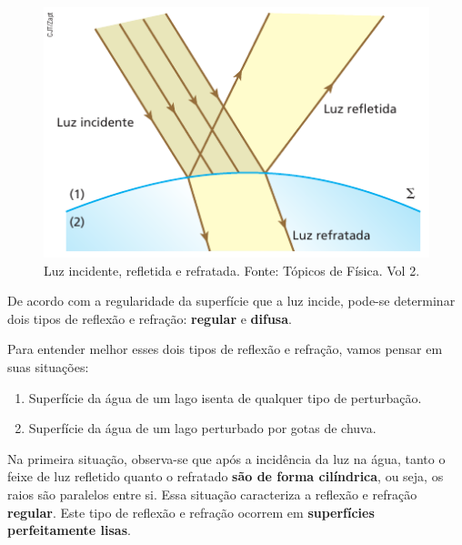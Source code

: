 \documentclass[11pt,twocolumn,oneside]{article}
\begin{document}
\begin{figure}[h]{}
\centering\includegraphics[width=2.5truein]{img7.png}
\caption{Luz incidente, refletida e refratada. Fonte: Tópicos de Física. Vol 2.}
\centering
\end{figure}

De acordo com a regularidade da superfície que a luz incide, pode-se determinar dois tipos de reflexão e refração: \textbf{regular} e \textbf{difusa}.


Para entender melhor esses dois tipos de reflexão e refração, vamos pensar em suas situações:


\begin{enumerate}

\item{Superfície da água de um lago isenta de qualquer tipo de perturbação.}

\item{Superfície da água de um lago perturbado por gotas de chuva.}

\end{enumerate}


Na primeira situação, observa-se que após a incidência da luz na água, tanto o feixe de luz refletido quanto o refratado \textbf{são de forma cilíndrica}, ou seja, os raios são paralelos entre si. Essa situação caracteriza a reflexão e refração \textbf{regular}. Este tipo de reflexão e refração ocorrem em \textbf{superfícies perfeitamente lisas}.
\end{document}
